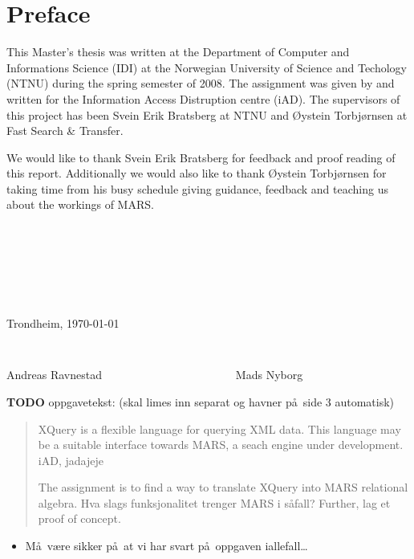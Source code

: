 \chapter*{Preface}

This Master's thesis was written at the Department of Computer and Informations Science (IDI) at the
Norwegian University of Science and Techology (NTNU) during the spring semester of 2008. The assignment was given
by and written for the Information Access Distruption centre (iAD). The supervisors of this project has been Svein
Erik Bratsberg at NTNU and \O ystein Torbj\o rnsen at Fast Search \& Transfer.

We would like to thank Svein Erik Bratsberg for feedback and proof reading of this report. Additionally we
would also like to thank \O ystein Torbj\o rnsen for taking time from his busy schedule giving guidance, feedback
and teaching us about the workings of MARS.

\begin{verbatim}







\end{verbatim}
\begin{center}

Trondheim, \today

\begin{verbatim}


\end{verbatim}
Andreas Ravnestad \verb!                      ! Mads Nyborg
\end{center}

\textbf{\LARGE TODO} oppgavetekst: (skal limes inn separat og havner p\aa~side 3 automatisk)

\begin{quote}
XQuery is a flexible language for querying XML data. This language may be a suitable interface towards MARS, a
seach engine under development. iAD, jadajeje

The assignment is to find a way to translate XQuery into MARS relational algebra. Hva slags funksjonalitet trenger
MARS i s\aa fall? Further, lag et proof of concept.
\end{quote}

\begin{itemize}
  \item M\aa~v\ae re sikker p\aa~at vi har svart p\aa~oppgaven iallefall\ldots
\end{itemize}
